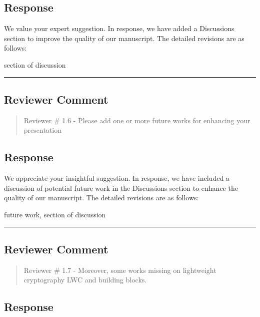 \subsection{Response}

We value your expert suggestion. In response, we have added a Discussions section to improve the quality of our manuscript. The detailed revisions are as follows:

\color{blue}
section of discussion

\color{black}

\noindent\rule{\linewidth}{2.0pt}

\subsection{Reviewer Comment}
\begin{mdframed}
	\begin{quote}
		Reviewer \# 1.6 - Please add one or more future works for enhancing your presentation
	\end{quote}
\end{mdframed}

\subsection{Response}

We appreciate your insightful suggestion. In response, we have included a discussion of potential future work in the Discussions section to enhance the quality of our manuscript. The detailed revisions are as follows:

\color{blue}

future work, section of discussion

\color{black}

\noindent\rule{\linewidth}{2.0pt}

\subsection{Reviewer Comment}
\begin{mdframed}
	\begin{quote}
		Reviewer \# 1.7 - Moreover, some works missing on lightweight cryptography LWC and building blocks.
	\end{quote}
\end{mdframed}

\subsection{Response}

